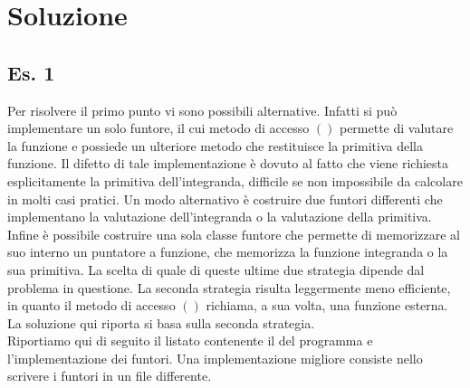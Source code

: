 \newpage

\section*{Soluzione}

\subsection*{Es. 1}

Per risolvere il primo punto vi sono possibili alternative. Infatti si pu\`o
implementare un solo funtore, il cui metodo di accesso $()$ permette di
valutare la funzione e possiede un ulteriore metodo che restituisce la
primitiva della funzione. Il difetto di tale implementazione \`e dovuto al
fatto che viene richiesta esplicitamente la primitiva dell'integranda,
difficile se non impossibile da calcolare in molti casi pratici.
Un modo alternativo \`e costruire due funtori differenti che implementano la
valutazione dell'integranda o la valutazione della primitiva. 
Infine \`e possibile costruire una sola classe funtore che permette di
memorizzare al suo interno un puntatore a funzione, che memorizza la funzione
integranda o la sua primitiva. La scelta di quale di queste ultime due 
strategia dipende dal problema in questione. La seconda
strategia risulta leggermente meno efficiente, in quanto il metodo di accesso
$()$ richiama, a sua volta, una funzione esterna. La soluzione qui riporta si
basa sulla seconda strategia.\\
Riportiamo qui di seguito il listato contenente il  del programma e
l'implementazione dei funtori. Una implementazione migliore consiste nello 
scrivere i funtori in un file differente.

\lstset{basicstyle=\scriptsize\sf}

\lstset{basicstyle=\sf}

